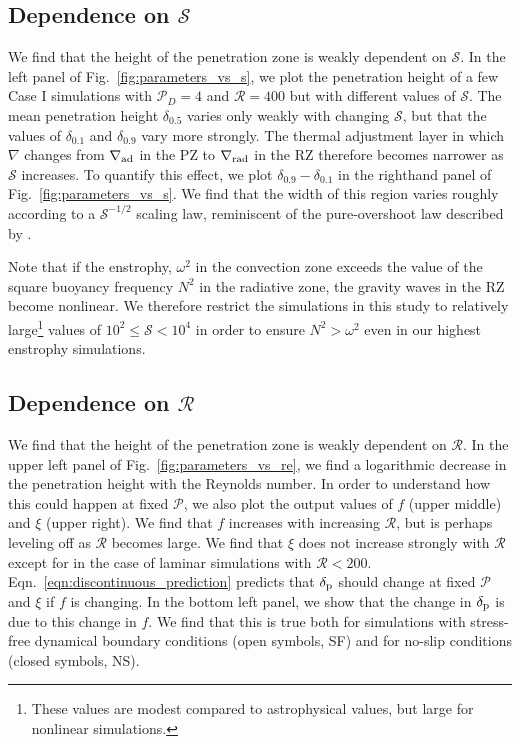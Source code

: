 \documentclass[twocolumn]{aastex631}
\newcommand{\gradrad}{\ensuremath{\nabla_{\rm{rad}}}}
\newcommand{\gradad}{\ensuremath{\nabla_{\rm{ad}}}}
\newcommand{\justgrad}{\ensuremath{\nabla}}
\newcommand{\delp}{\ensuremath{\delta_{\rm{p}}}}
\newcommand{\mP}{\ensuremath{\mathcal{P}}}
\newcommand{\mR}{\ensuremath{\mathcal{R}}}
\newcommand{\mS}{\ensuremath{\mathcal{S}}}
\begin{document}
\subsection{Dependence on $\mS$}

We find that the height of the penetration zone is weakly dependent on $\mS$.
In the left panel of Fig.~\ref{fig:parameters_vs_s}, we plot the penetration height of a few Case I simulations with $\mP_D = 4$ and $\mR = 400$ but with different values of $\mS$.
The mean penetration height $\delta_{0.5}$ varies only weakly with changing $\mS$, but that the values of $\delta_{0.1}$ and $\delta_{0.9}$ vary more strongly.
The thermal adjustment layer in which $\justgrad$ changes from $\gradad$ in the PZ to $\gradrad$ in the RZ therefore becomes narrower as $\mS$ increases.
To quantify this effect, we plot $\delta_{0.9} - \delta_{0.1}$ in the righthand panel of Fig.~\ref{fig:parameters_vs_s}.
We find that the width of this region varies roughly according to a $\mS^{-1/2}$ scaling law, reminiscent of the pure-overshoot law described by \citet{korre_etal_2019}.

Note that if the enstrophy, $\omega^2$ in the convection zone exceeds the value of the square buoyancy frequency $N^2$ in the radiative zone, the gravity waves in the RZ become nonlinear.
We therefore restrict the simulations in this study to relatively large\footnote{These values are modest compared to astrophysical values, but large for nonlinear simulations.} values of $10^{2} \leq \mS < 10^4$ in order to ensure $N^2 > \omega^2$ even in our highest enstrophy simulations.



\subsection{Dependence on $\mR$}

We find that the height of the penetration zone is weakly dependent on $\mR$.
In the upper left panel of Fig.~\ref{fig:parameters_vs_re}, we find a logarithmic decrease in the penetration height with the Reynolds number.
In order to understand how this could happen at fixed $\mP$, we also plot the output values of $f$ (upper middle) and $\xi$ (upper right).
We find that $f$ increases with increasing $\mR$, but is perhaps leveling off as $\mR$ becomes large.
We find that $\xi$ does not increase strongly with $\mR$ except for in the case of laminar simulations with $\mR < 200$.
Eqn.~\ref{eqn:discontinuous_prediction} predicts that $\delp$ should change at fixed $\mP$ and $\xi$ if $f$ is changing.
In the bottom left panel, we show that the change in $\delp$ is due to this change in $f$.
We find that this is true both for simulations with stress-free dynamical boundary conditions (open symbols, SF) and for no-slip conditions (closed symbols, NS).
\end{document}
